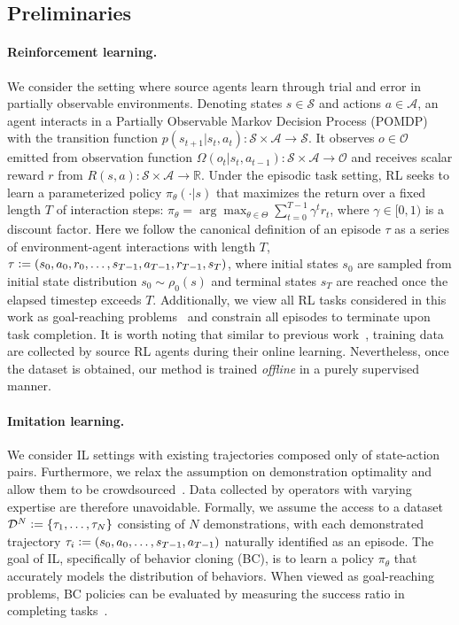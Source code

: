 \documentclass{article}
\newcommand{\para}[1]{\paragraph{#1}\looseness=-1}
\begin{document}
\subsection{Preliminaries}
\para{Reinforcement learning.}
We consider the setting where source agents learn through trial and error in partially observable environments.
Denoting states $s \in \mathcal{S}$ and actions $a \in \mathcal{A}$, an agent interacts in a Partially Observable Markov Decision Process (POMDP) with the transition function $p(s_{t + 1} \vert s_t, a_t): \mathcal{S} \times \mathcal{A} \rightarrow \mathcal{S}$. It observes $o \in \mathcal{O}$ emitted from observation function $\Omega(o_t \vert s_t, a_{t - 1}): \mathcal{S} \times \mathcal{A} \rightarrow \mathcal{O}$ and receives scalar reward $r$ from $R (s, a): \mathcal{S} \times \mathcal{A} \rightarrow \mathbb{R}$.
Under the episodic task setting,
RL seeks to learn a parameterized policy $\pi_\theta (\cdot \vert s)$ that maximizes the return over a fixed length $T$ of interaction steps: $\pi_\theta = \arg \max_{\theta \in \Theta} \sum_{t = 0}^{T - 1} \gamma^t r_t$, where $\gamma \in [0, 1)$ is a discount factor.
Here we follow the canonical definition of an episode $\tau$ as a series of environment-agent interactions with length $T$, $\tau \vcentcolon= (s_0, a_0, r_0, \ldots, s_{T - 1}, a_{T - 1}, r_{T - 1}, s_T)$, where initial states $s_0$ are sampled from initial state distribution $s_0 \sim \rho_0(s)$ and terminal states $s_T$ are reached once the elapsed timestep exceeds $T$.
Additionally, we view all RL tasks considered in this work as goal-reaching problems~\citep{Kaelbling1993LearningTA,ghosh2019learning} and constrain all episodes to terminate upon task completion.
It is worth noting that similar to previous work~\citep{laskin2023incontext}, training data are collected by source RL agents during their online learning. Nevertheless, once the dataset is obtained, our method is trained \emph{offline} in a purely supervised manner.
\para{Imitation learning.}
We consider IL settings with existing trajectories composed only of state-action pairs.
Furthermore, we relax the assumption on demonstration optimality and allow them to be crowdsourced~\citep{brown2019extrapolating,chen2020learning,cao2021learning}.
Data collected by operators with varying expertise are therefore unavoidable.
Formally, we assume the access to a dataset $\mathcal{D}^N \vcentcolon= \{\tau_1, \ldots, \tau_{N}\}$ consisting of $N$ demonstrations, with each demonstrated trajectory $\tau_i \vcentcolon= (s_0, a_0, \ldots, s_{T - 1}, a_{T - 1})$ naturally identified as an episode.
The goal of IL, specifically of behavior cloning (BC), is to learn a policy $\pi_\theta$ that accurately models the distribution of behaviors.
When viewed as goal-reaching problems, BC policies can be evaluated by measuring the success ratio in completing tasks~\citep{ghosh2019learning}.
\end{document}
